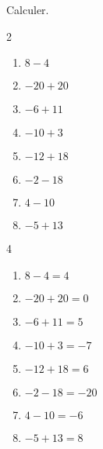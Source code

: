 \begin{exercice*}
    Calculer.
    \begin{multicols}2
        \begin{enumerate}
            \item $ 8-4 $
            \item $ -20+20 $
            \item $ -6+11 $
            \item $ -10+3 $
            \item $ -12+18 $
            \item $ -2-18 $
            \item $ 4-10 $
            \item $ -5+13 $
        \end{enumerate}
    \end{multicols}
\end{exercice*}
\begin{corrige}
    \phantom{rrr}    
    \begin{multicols}4
        \begin{enumerate}
            \item $ 8-4 = 4 $
            \item $ -20+20 = 0 $
            \item $ -6+11 = 5 $
            \item $ -10+3 = -7 $
            \item $ -12+18 = 6 $
            \item $ -2-18 = -20 $
            \item $ 4-10 = -6 $
            \item $ -5+13 = 8 $
        \end{enumerate}
    \end{multicols}
\end{corrige}